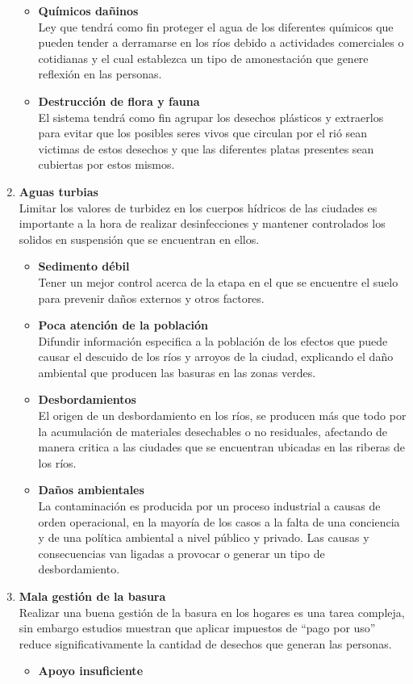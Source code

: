 \begin{enumerate}
\begin{itemize}
		      \item \textbf{Químicos dañinos}\\
		            Ley que tendrá como fin  proteger el agua de los diferentes químicos que pueden tender a derramarse en los ríos debido a actividades comerciales o cotidianas y el cual establezca un tipo de amonestación que genere reflexión en las personas.
		      \item \textbf{Destrucción de flora y fauna}\\
		            El sistema tendrá como fin agrupar los desechos plásticos y extraerlos para evitar que los posibles seres vivos que circulan por el rió sean victimas de estos desechos y que las diferentes platas presentes sean cubiertas por estos mismos.
	      \end{itemize}
	\item \textbf{Aguas turbias}\\
	      Limitar los valores de turbidez en los cuerpos hídricos de las ciudades es importante a la hora de realizar desinfecciones y mantener controlados los solidos en suspensión que se encuentran en ellos.
	      \begin{itemize}
		      \item \textbf{Sedimento débil} \\
		            Tener un mejor control acerca de la etapa en el que se encuentre el suelo para prevenir daños externos y otros factores.
		      \item \textbf{Poca atención de la población}\\
		            Difundir información especifica a la población de los efectos que puede causar el descuido de los ríos y arroyos de la ciudad, explicando el daño ambiental que producen las basuras en las zonas verdes.
		      \item \textbf{Desbordamientos} \\
		            El origen de un desbordamiento en los ríos, se producen más que todo por la acumulación de materiales desechables o no residuales, afectando de manera critica a las ciudades que se encuentran ubicadas en las riberas de los ríos.
		      \item \textbf{Daños ambientales}\\
		            La contaminación es producida por un proceso industrial a causas de orden operacional, en la mayoría de los casos a la falta de una conciencia y de una política ambiental a nivel público y privado. Las causas y consecuencias van ligadas a provocar o generar un tipo de desbordamiento.
	      \end{itemize}
	\item \textbf{Mala gestión de la basura}\\
	      Realizar una buena gestión de la basura en los hogares es una tarea compleja, sin embargo estudios muestran que aplicar impuestos de ``pago por uso'' reduce significativamente la cantidad de desechos que generan las personas.
	      \begin{itemize}
		      \item  \textbf{Apoyo insuficiente}\\


\end{itemize}
\end{enumerate}
